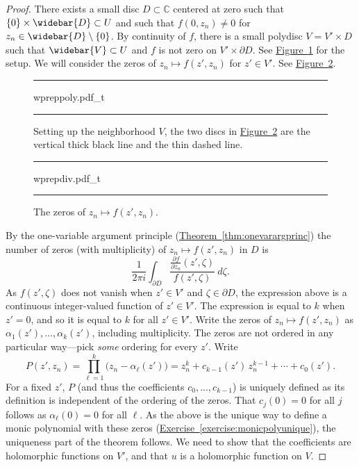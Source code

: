 \documentclass[12pt,openany]{book}
\newcommand{\C}{{\mathbb{C}}}
\theoremstyle{plain}
\theoremstyle{remark}
\theoremstyle{definition}
\newenvironment{myfig}{%
\begin{figure}[h!t]
\noindent\rule{\textwidth}{0.5pt}\vspace{12pt}\par\centering}%
{\par\noindent\rule{\textwidth}{0.5pt}
\end{figure}}
\theoremstyle{exercise}
\theoremstyle{example}
\newcommand{\figureref}[1]{\hyperref[#1]{Figure~\ref*{#1}}}
\newcommand{\exerciseref}[1]{\hyperref[#1]{Exercise~\ref*{#1}}}
\newcommand{\thmref}[1]{\hyperref[#1]{Theorem~\ref*{#1}}}
\begin{document}
\begin{proof}
There exists a small disc $D \subset \C$ centered at zero such that
$\{0\} \times \widebar{D} \subset U$ and such that
$f(0,z_n) \not= 0$ for $z_n \in \widebar{D} \setminus \{ 0 \}$.
By continuity
of $f$,
there is a small polydisc $V = V' \times D$ such that
$\widebar{V} \subset U$ and $f$ is not zero on
$V' \times \partial D$.
See \figureref{fig:wpreppoly} for the setup.
We will consider the zeros of
$z_n \mapsto f(z',z_n)$ for $z' \in V'$.  See \figureref{fig:wprepdiv}.
\begin{myfig}
{wpreppoly.pdf_t}
\caption{Setting up the neighborhood $V$, the two discs in
\figureref{fig:wprepdiv} are the vertical thick black line and the
thin dashed line.\label{fig:wpreppoly}}
\end{myfig}
\begin{myfig}
{wprepdiv.pdf_t}
\caption{The zeros of $z_n \mapsto f(z',z_n)$.\label{fig:wprepdiv}}
\end{myfig}

By the one-variable argument principle (\thmref{thm:onevarargprinc}) the number of zeros (with
multiplicity) of $z_n
\mapsto f(z',z_n)$ in $D$ is
\begin{equation*}
\frac{1}{2\pi i}
\int_{\partial D}
\frac{\frac{\partial f}{\partial z_n} (z',\zeta)}{f(z',\zeta)} ~d\zeta .
\end{equation*}
As $f(z',\zeta)$ does not vanish when $z' \in V'$ and $\zeta \in \partial
D$,
the expression above is a continuous integer-valued
function of $z' \in V'$.
The expression
is equal to $k$ when $z'=0$, and
so it is equal to $k$ for all $z' \in V'$.
Write
the zeros of $z_n \mapsto f(z',z_n)$ as $\alpha_1(z'),\ldots,\alpha_k(z')$, including
multiplicity.
The zeros are not ordered in any particular way---pick
\emph{some} ordering for every $z'$.
Write
\begin{equation*}
P(z',z_n)
=
\prod_{\ell=1}^k \bigl(z_n-\alpha_\ell(z')\bigr)
=
z_n^k + c_{k-1}(z') \, z_n^{k-1} + \cdots + c_0 (z') .
\end{equation*}
For a fixed $z'$, $P$ (and thus the coefficients $c_0,\ldots,c_{k-1}$)
is uniquely defined as its definition is independent of the ordering of the
zeros.
That $c_j(0) = 0$ for all $j$ follows as $\alpha_\ell(0)=0$ for all $\ell$.
As the above is the unique way to define a monic polynomial with these zeros
(\exerciseref{exercise:monicpolyunique}),
the uniqueness part of the theorem follows.
We need to show that the coefficients are holomorphic functions on $V'$,
and that $u$ is a holomorphic function on $V$.


\end{proof}
\end{document}
